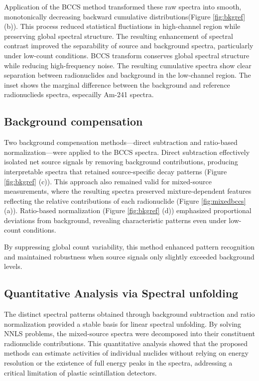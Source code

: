 \documentclass[10pt]{wlscirep}
\begin{document}
Application of the BCCS method transformed these raw spectra into smooth, monotonically decreasing backward cumulative distributions(Figure \ref{fig:bkgref} (b)). This process reduced statistical fluctiations in high-channel region while preserving global spectral structure. The resulting enhancement of spectral contrast improved the separability of source and background spectra, particularly under low-count conditions. BCCS transform conserves global spectral structure while reducing high-frequency noise. The resulting cumulative spectra show clear separation between radionuclides and background in the low-channel region. The inset shows the marginal difference between the background and reference radionuclieds spectra, especailly Am-241 spectra.

\subsection*{Background compensation}

Two background compensation methods—direct subtraction and ratio-based normalization—were applied to the BCCS spectra. Direct subtraction effectively isolated net source signals by removing background contributions, producing interpretable spectra that retained source-specific decay patterns (Figure \ref{fig:bkgref} (c)). This approach also remained valid for mixed-source measurements, where the resulting spectra preserved mixture-dependent features reflecting the relative contributions of each radionuclide (Figure \ref{fig:mixedbccs} (a)).
Ratio-based normalization (Figure \ref{fig:bkgref} (d)) emphasized proportional deviations from background, revealing characteristic patterns even under low-count conditions. 

By suppressing global count variability, this method enhanced pattern recognition and maintained robustness when source signals only slightly exceeded background levels.  

\subsection*{Quantitative Analysis via Spectral unfolding}

The distinct spectral patterns obtained through background subtraction and ratio normalization provided a stable basis for linear spectral unfolding. By solving NNLS problems, the mixed-source spectra were decomposed into their constituent radionuclide contributions. This quantitative analysis showed that the proposed methods can estimate activities of individual nuclides without relying on energy resolution or the existence of full energy peaks in the spectra, addressing a critical limitation of plastic scintillation detectors.
\end{document}
